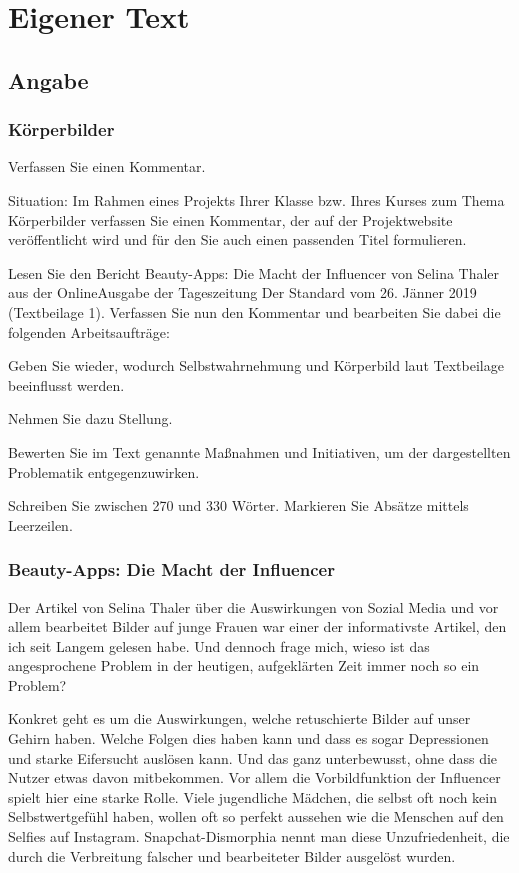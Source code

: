 \section{Eigener Text}
\subsection{Angabe}
\subsubsection{Körperbilder }

Verfassen Sie einen Kommentar. 

Situation: Im Rahmen eines Projekts Ihrer Klasse bzw. Ihres Kurses zum Thema Körperbilder verfassen Sie einen Kommentar, der auf der Projektwebsite veröffentlicht wird und für den Sie auch einen passenden Titel formulieren. 

Lesen Sie den Bericht Beauty-Apps: Die Macht der Influencer von Selina Thaler aus der OnlineAusgabe der Tageszeitung Der Standard vom 26. Jänner 2019 (Textbeilage 1). Verfassen Sie nun den Kommentar und bearbeiten Sie dabei die folgenden Arbeitsaufträge: 

\begin{compactitem}
    \item Geben Sie wieder, wodurch Selbstwahrnehmung und Körperbild laut Textbeilage beeinflusst werden.  
    \item Nehmen Sie dazu Stellung. 
    \item Bewerten Sie im Text genannte Maßnahmen und Initiativen, um der dargestellten Problematik entgegenzuwirken. 
\end{compactitem}

Schreiben Sie zwischen 270 und 330 Wörter. Markieren Sie Absätze mittels Leerzeilen.

\subsubsection{Beauty-Apps: Die Macht der Influencer }

Der Artikel von Selina Thaler über die Auswirkungen von Sozial Media und vor allem bearbeitet Bilder auf junge Frauen war einer der informativste Artikel, den ich seit Langem gelesen habe. Und dennoch frage mich, wieso ist das angesprochene Problem in der heutigen, aufgeklärten Zeit immer noch so ein Problem? 

Konkret geht es um die Auswirkungen, welche retuschierte Bilder auf unser Gehirn haben. Welche Folgen dies haben kann und dass es sogar Depressionen und starke Eifersucht auslösen kann. Und das ganz unterbewusst, ohne dass die Nutzer etwas davon mitbekommen. Vor allem die Vorbildfunktion der Influencer spielt hier eine starke Rolle. Viele jugendliche Mädchen, die selbst oft noch kein Selbstwertgefühl haben, wollen oft so perfekt aussehen wie die Menschen auf den Selfies auf Instagram. Snapchat-Dismorphia nennt man diese Unzufriedenheit, die durch die Verbreitung falscher und bearbeiteter Bilder ausgelöst wurden. 

